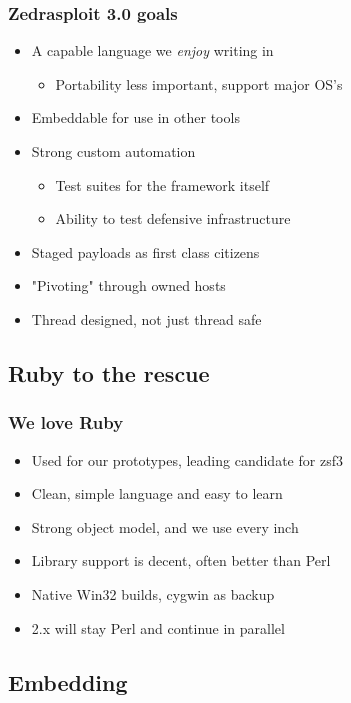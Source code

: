 \documentclass{beamer}
\newenvironment{sitemize}{\vspace{1mm}\begin{itemize}\itemsep 4pt\small}{\end{itemize}}
\begin{document}
\begin{frame}[t]
  \frametitle{Zedrasploit 3.0 goals}
  
  \begin{sitemize}
    \item A capable language we \emph{enjoy} writing in
    \begin{sitemize}
      \item Portability less important, support major OS's
    \end{sitemize}
    \pause
   \item Embeddable for use in other tools
    \pause
    \item Strong custom automation
    \begin{sitemize}
      \item Test suites for the framework itself
      \item Ability to test defensive infrastructure
    \end{sitemize}
    \pause
    \item Staged payloads as first class citizens
    \pause
    \item "Pivoting" through owned hosts
    \pause
    \item Thread designed, not just thread safe
  \end{sitemize}
\end{frame}

\subsection{Ruby to the rescue}

\begin{frame}[t]
  \frametitle{We love Ruby}
  \begin{sitemize}
    \item Used for our prototypes, leading candidate for zsf3
    \item Clean, simple language and easy to learn
    \item Strong object model, and we use every inch
    \pause
    \item Library support is decent, often better than Perl
    \item Native Win32 builds, cygwin as backup
    \item 2.x will stay Perl and continue in parallel
  \end{sitemize}
\end{frame}

\subsection{Embedding}
\end{document}
